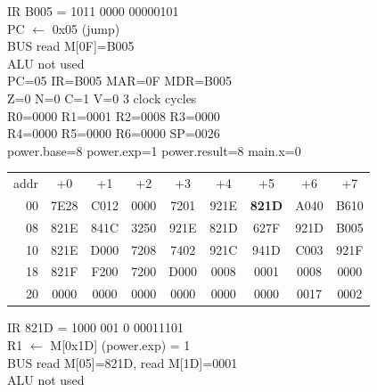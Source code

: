 \noindent\begin{tcolorbox}[stepbox, title={Step 20 \hfill PC 0F \quad JMP power.while1}]
\textcolor{dim}{IR} B005 = 1011 0000 00000101\\
PC $\leftarrow$ 0x05 (jump)\\
\textcolor{dim}{BUS} read M[0F]=B005\\
\textcolor{dim}{ALU} \textcolor{dim}{not used}\\
PC=05 IR=B005 MAR=0F MDR=B005\\
Z=0 N=0 C=1 V=0 \hfill \textcolor{dim}{3 clock cycles}\\
R0=0000 R1=0001 R2=0008 R3=0000\\
R4=0000 R5=0000 R6=0000 SP=0026\\
\textcolor{dim}{power.base=8  power.exp=1  power.result=8  main.x=0}\\[1pt]
{\setlength{\tabcolsep}{1.6pt}\begin{tabular}{@{}r*{8}{c}@{}}
\textcolor{dim}{addr} & \textcolor{dim}{+0} & \textcolor{dim}{+1} & \textcolor{dim}{+2} & \textcolor{dim}{+3} & \textcolor{dim}{+4} & \textcolor{dim}{+5} & \textcolor{dim}{+6} & \textcolor{dim}{+7}\\
\textcolor{dim}{00} & 7E28 & C012 & 0000 & 7201 & 921E & \cellcolor{pcc}\textbf{821D} & A040 & B610\\
\textcolor{dim}{08} & 821E & 841C & 3250 & 921E & 821D & 627F & 921D & B005\\
\textcolor{dim}{10} & 821E & D000 & 7208 & 7402 & 921C & 941D & C003 & 921F\\
\textcolor{dim}{18} & 821F & F200 & 7200 & D000 & \cellcolor{datac}0008 & \cellcolor{datac}0001 & \cellcolor{datac}0008 & \cellcolor{datac}0000\\
\textcolor{dim}{20} & \cellcolor{stackc}0000 & \cellcolor{stackc}0000 & \cellcolor{stackc}0000 & \cellcolor{stackc}0000 & \cellcolor{stackc}0000 & \cellcolor{stackc}0000 & \cellcolor{stackc}0017 & \cellcolor{stackc}0002\\
\end{tabular}}
\end{tcolorbox}\hfill\begin{tcolorbox}[stepbox, title={Step 21 \hfill PC 05 \quad LD R1, power.exp}]
\textcolor{dim}{IR} 821D = 1000 001 0 00011101\\
R1 $\leftarrow$ M[0x1D] (power.exp) = 1\\
\textcolor{dim}{BUS} read M[05]=821D, read M[1D]=0001\\
\textcolor{dim}{ALU} \textcolor{dim}{not used}\\

\end{tcolorbox}
